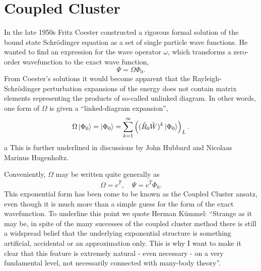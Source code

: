 \chapter{Coupled Cluster}

In the late 1950s Fritz Coester constructed a rigorous formal solution of the bound
state Schrödinger equation as a set of single particle wave
functions\cite{coester1958bound}. He wanted to find an expression for the wave operator 
$\omega$, which transforms a zero-order wavefunction to the exact wave function,
\begin{equation}
    \Psi = \Omega \Phi_0.
\end{equation}
From Coester's solutions it would become apparent that the Rayleigh-Schrödinger 
perturbation expansions of the energy does not contain matrix elements representing 
the products of so-called unlinked diagram. In other words, one form of $\Omega$ is 
given a ``linked-diagram expansion'',
\begin{equation}
    \Omega\ket{\Phi_0} = \ket{\Phi_0} 
    = \sum_{k=1}^\infty\left((\hat{R}_0\hat{W})^k \ket{{\Phi_0}} \right)_L.
\end{equation}a
This is further underlined in discussions by John Hubbard\cite{hubbard1957description}
and Nicolaas Marinus Hugenholtz\cite{hugenholtz1957perturbation}.

Conveniently, $\Omega$ may be written quite generally as
\begin{equation}
    \Omega = e^{\hat{T}}, \quad \Psi = e^{\hat{T}}\Phi_0.
\end{equation}
This exponential form has been come to be known as the Coupled Cluster ansatz, even 
though it is much more than a simple guess for the form of the exact wavefunction.
To underline this point we quote Herman Kümmel: ``Strange as it may be, in spite of
the many successes of the coupled cluster method there is still a widspread belief
that the underlying exponential structure is something artificial, accidental or 
an approximation only. This is why I want to make it clear that this feature is 
extremely natural - even necessary - on a very fundamental level, not necessarily
connected with many-body theory''\cite{kummel1991origins}. 


